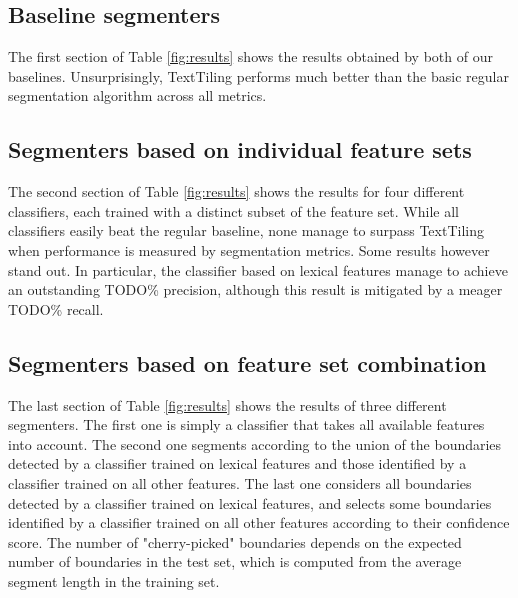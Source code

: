 \subsection{Baseline segmenters}

The first section of Table \ref{fig:results} shows the results obtained by both of our baselines. Unsurprisingly, TextTiling performs much better than the basic regular segmentation algorithm across all metrics.

\subsection{Segmenters based on individual feature sets}

The second section of Table \ref{fig:results} shows the results for four different classifiers, each trained with a distinct subset of the feature set. While all classifiers easily beat the regular baseline, none manage to surpass TextTiling when performance is measured by segmentation metrics. Some results however stand out. In particular, the classifier based on lexical features manage to achieve an outstanding TODO\% precision, although this result is mitigated by a meager TODO\% recall.

\subsection{Segmenters based on feature set combination}

The last section of Table \ref{fig:results} shows the results of three different segmenters. The first one is simply a classifier that takes all available features into account. The second one segments according to the union of the boundaries detected by a classifier trained on lexical features and those identified by a classifier trained on all other features. The last one considers all boundaries detected by a classifier trained on lexical features, and selects some boundaries identified by a classifier trained on all other features according to their confidence score. The number of "cherry-picked" boundaries depends on the expected number of boundaries in the test set, which is computed from the average segment length in the training set.